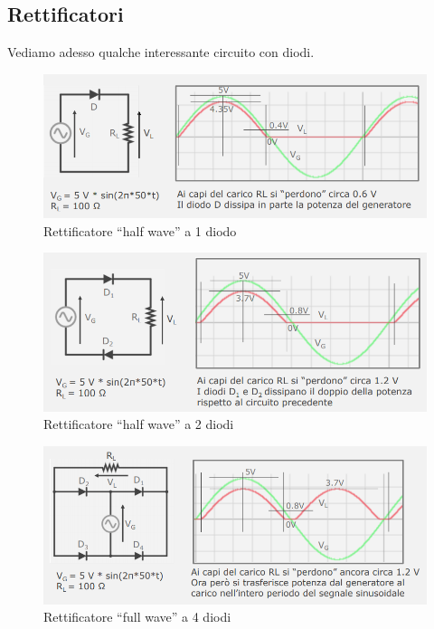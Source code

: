 \documentclass{article}
\begin{document}
\subsection{Rettificatori}

Vediamo adesso qualche interessante circuito con diodi.

\begin{figure}[h]
  \centering
  \includegraphics[scale=0.6]{IM_rettificatore_half_wave}
  \caption{Rettificatore ``half wave'' a 1 diodo}
  \label{Schema_rettificatore_half_wave}
\end{figure}

\begin{figure}[h]
  \centering
  \includegraphics[scale=0.6]{IM_rettificatore_half_wave_2}
  \caption{Rettificatore ``half wave'' a 2 diodi}
  \label{Schema_rettificatore_half_wave_2}
\end{figure}

\begin{figure}[h]
  \centering
  \includegraphics[scale=0.6]{IM_rettificatore_full_wave}
  \caption{Rettificatore ``full wave'' a 4 diodi}
  \label{Schema_rettificatore_full_wave}
\end{figure}
\end{document}
